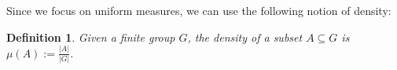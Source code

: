 \documentclass[11pt, letterpaper]{amsart}
\newtheorem{definition}[thm]{Definition}
\begin{document}


Since we focus on uniform measures, we can use the following notion of density:
\begin{definition}\label{def:density}
    Given a finite group $G$, the \emph{density} of a subset $A \subseteq G$ is $\mu(A) := \frac{|A|}{|G|}$.
\end{definition}
\end{document}
